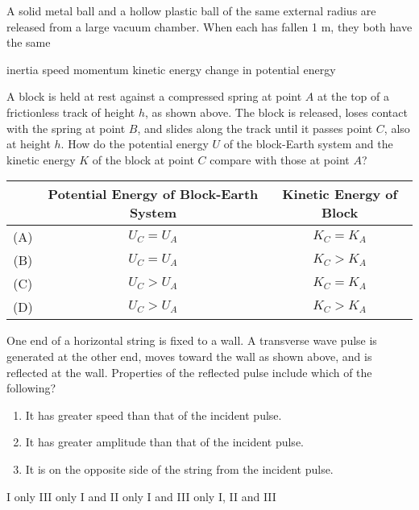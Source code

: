 \documentclass[12pt]{exam}
\newcommand{\pic}[2]{
  \begin{center}
    \texttt{[image: \#2]}
  \end{center}
}
\begin{document}
\begin{questions}
  \question A solid metal ball and a hollow plastic ball of the same external
  radius are released from a large vacuum chamber. When each has fallen 1 m,
  they both have the same
  \begin{choices}
    \choice inertia
    \choice speed
    \choice momentum
    \choice kinetic energy
    \choice change in potential energy
  \end{choices}
  
  \uplevel{
    \vspace{-.3in}
    \pic{.5}{spring-block}
  }
  \question\vspace{-.2in} A block is held at rest against a compressed spring
  at point $A$ at the top of a frictionless track of height $h$, as shown
  above. The block is released, loses contact with the spring at point $B$, and
  slides along the track until it passes point $C$, also at height $h$. How do
  the potential energy $U$ of the block-Earth system and the kinetic energy $K$
  of the block at point $C$ compare with those at point $A$?
  
  \begin{tabular}{ccc}
    & Potential Energy of Block-Earth System & Kinetic Energy of Block\\
    \hline
    (A) & $U_C=U_A$ & $K_C=K_A$ \\
    (B) & $U_C=U_A$ & $K_C>K_A$ \\
    (C) & $U_C>U_A$ & $K_C=K_A$ \\
    (D) & $U_C>U_A$ & $K_C>K_A$
  \end{tabular}

  \question One end of a horizontal string is fixed to a wall. A transverse
  wave pulse is generated at the other end, moves toward the wall as shown
  above, and is reflected at the wall. Properties of the reflected pulse
  include which of the following?
  \begin{enumerate}[nosep,leftmargin=18pt,label={\Roman*.}]
  \item It has greater speed than that of the incident pulse.
  \item It has greater amplitude than that of the incident pulse.
  \item It is on the opposite side of the string from the incident pulse.
  \end{enumerate}
  \begin{choices}
    \choice I only
    \choice III only
    \choice I and II only
    \choice I and III only
    \choice I, II and III
  \end{choices}
  

\end{questions}
\end{document}
